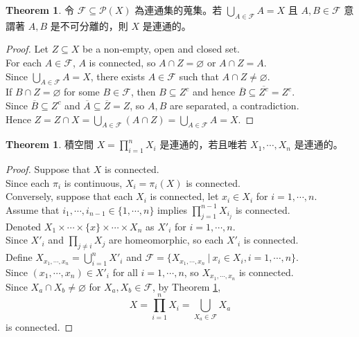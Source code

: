 \documentclass[12pt]{article}
\theoremstyle{definition}
\newtheorem{theorem}[definition]{Theorem}
\newcommand\<{\langle}
\renewcommand\>{\rangle}
\begin{document}
\begin{CJK}{UTF8}{bsmi}
\begin{theorem}
\label{union of connected sets is connected}
    令 $\mathcal{F}\subseteq\mathcal{P}(X)$ 為連通集的蒐集。若 $\bigcup_{A\in\mathcal{F}}A=X$ 且 $A, B\in\mathcal{F}$ 意謂著 $A, B$ 是不可分離的，則 $X$ 是連通的。
\end{theorem}
\begin{proof}
    Let $Z\subseteq X$ be a non-empty, open and closed set. \\
    For each $A\in\mathcal{F}$, $A$ is connected, so $A\cap Z=\varnothing$ or $A\cap Z=A$. \\
    Since $\bigcup_{A\in\mathcal{F}}A=X$, there exists $A\in\mathcal{F}$ such that $A\cap Z\ne\varnothing$. \\
    If $B\cap Z=\varnothing$ for some $B\in\mathcal{F}$, then $B\subseteq Z^c$ and hence $\overline{B}\subseteq\overline{Z^c}=Z^c$. \\
    Since $\overline{B}\subseteq Z^c$ and $\overline{A}\subseteq\overline{Z}=Z$, so $A, B$ are separated, a contradiction. \\
    Hence $Z=Z\cap X=\bigcup_{A\in\mathcal{F}}(A\cap Z)=\bigcup_{A\in\mathcal{F}}A=X$.
\end{proof}

\begin{theorem}
    積空間 $X=\prod_{i=1}^n X_i$ 是連通的，若且唯若 $X_1, \cdots, X_n$ 是連通的。
\end{theorem}
\begin{proof}
    Suppose that $X$ is connected. \\
    Since each $\pi_i$ is continuous, $X_i=\pi_i(X)$ is connected. \\
    Conversely, suppose that each $X_i$ is connected, let $x_i\in X_i$ for $i=1, \cdots, n$. \\
    Assume that $i_1, \cdots, i_{n-1}\in\{1, \cdots, n\}$ implies $\prod_{j=1}^{n-1}X_{i_j}$ is connected. \\
    Denoted $X_1\times\cdots\times\{x\}\times\cdots\times X_n$ as $X'_i$ for $i=1, \cdots, n$. \\
    Since $X'_i$ and $\prod_{j\ne i}X_j$ are homeomorphic, so each $X'_i$ is connected. \\
    Define $X_{x_1, \cdots, x_n}=\bigcup_{i=1}^n X'_i$ and $\mathcal{F}=\{X_{x_1, \cdots, x_n}\ |\ x_i\in X_i, i=1, \cdots, n\}$. \\
    Since $(x_1, \cdots, x_n)\in X'_i$ for all $i=1, \cdots, n$, so $X_{x_1, \cdots, x_n}$ is connected. \\
    Since $X_a\cap X_b\ne\varnothing$ for $X_a, X_b\in\mathcal{F}$, by Theorem \ref{union of connected sets is connected}, 
    \[
        X=\prod_{i=1}^n X_i=\bigcup_{X_a\in\mathcal{F}}X_a
    \]
    is connected.
\end{proof}


\end{CJK}
\end{document}
